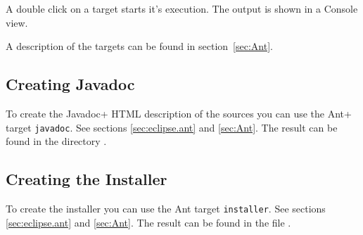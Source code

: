 A double click on a target starts it's execution. The output is shown
in a Console view.

A description of the targets can be found in section~\ref{sec:Ant}.


\subsection{Creating Javadoc}

To create the \+Javadoc+ HTML description of the sources you can use
the \+Ant+ target \texttt{javadoc}. See sections \ref{sec:eclipse.ant}
and \ref{sec:Ant}. The result can be found in the directory
.


\subsection{Creating the Installer}

To create the installer you can use the Ant target
\texttt{installer}. See sections \ref{sec:eclipse.ant} and
\ref{sec:Ant}. The result can be found in the file
.


